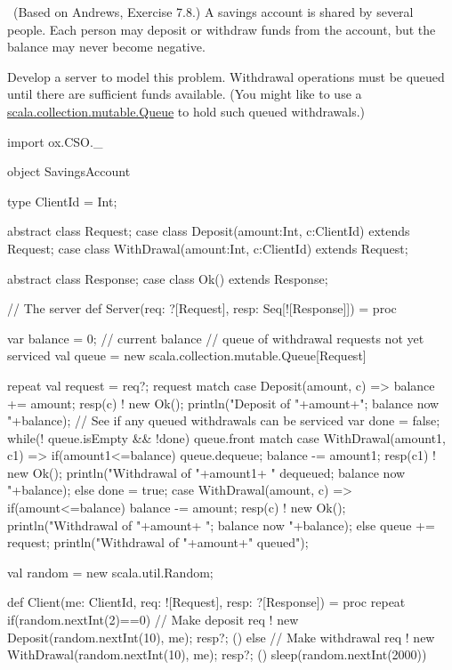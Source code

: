 \begin{question}
\Programming\ (Based on Andrews, Exercise 7.8.)  
%
A savings account is shared by several people.  Each person may deposit or
withdraw funds from the account, but the balance may never become negative.  

Develop a server to model this problem.  Withdrawal operations must be queued
until there are sufficient funds available.  (You might like to use a
\url{scala.collection.mutable.Queue} to hold such queued withdrawals.)
\end{question}


\begin{answer}
\begin{scala}
import ox.CSO._

object SavingsAccount{
  type ClientId = Int;
 
  abstract class Request;
  case class Deposit(amount:Int, c:ClientId) extends Request; 
  case class WithDrawal(amount:Int, c:ClientId) extends Request;

  abstract class Response;
  case class Ok() extends Response; 
 
  // The server
  def Server(req: ?[Request], resp: Seq[![Response]]) = proc{
    var balance = 0; // current balance
    // queue of withdrawal requests not yet serviced
    val queue = new scala.collection.mutable.Queue[Request] 

    repeat{
      val request = req?;
      request match{
	case Deposit(amount, c) => {
	  balance += amount;
	  resp(c) ! new Ok();
	  println("Deposit of "+amount+"; balance now "+balance);
	  // See if any queued withdrawals can be serviced
	  var done = false;
	  while(! queue.isEmpty && !done){
	    queue.front match{
	      case WithDrawal(amount1, c1) => {
		if(amount1<=balance){
		  queue.dequeue; balance -= amount1; 
                  resp(c1) ! new Ok();
		  println("Withdrawal of "+amount1+ 
                    " dequeued; balance now "+balance);
		} 
		else done = true;
	      }
	    }
	  }
	}
	case WithDrawal(amount, c) => {
	  if(amount<=balance){
	    balance -= amount; resp(c) ! new Ok();
	    println("Withdrawal of "+amount+
                    "; balance now "+balance);
	  }
	  else{
	    queue += request;
	    println("Withdrawal of "+amount+" queued");
	  }
	}
      }
    }
  }

  val random = new scala.util.Random;

  def Client(me: ClientId, req: ![Request], resp: ?[Response]) 
  = proc{
    repeat{
      if(random.nextInt(2)==0){	// Make deposit
	req ! new Deposit(random.nextInt(10), me);
	resp?; ()
      }
      else{ // Make withdrawal
	req ! new WithDrawal(random.nextInt(10), me);
	resp?; ()
      }
      sleep(random.nextInt(2000))
    }
  }

}
\end{scala}
\end{answer}
